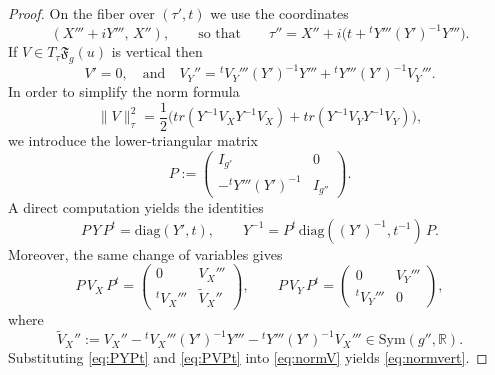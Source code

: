 \documentclass[11pt]{amsart}
\theoremstyle{plain}
\theoremstyle{definition}
\theoremstyle{remark}
\newcommand{\R}{\mathbb R}
\newcommand{\fF}{\mathfrak{F}}
\begin{document}
\begin{proof}
    On the fiber over $(\tau',t)$ we use the coordinates
    \[
        (X'''+iY''',\,X''),
        \qquad\text{so that}\qquad
        \tau''=X'' + i\bigl(t+{}^tY'''(Y')^{-1}Y'''\bigr).
    \]
    If $V\in T_{\tau}\fF_g(u)$ is vertical then
    \begin{equation}
        V'=0,\quad\text{and}\quad 
        V_Y'' ={}^tV_Y'''(Y')^{-1}Y'''+{}^tY'''(Y')^{-1}V_Y'''.
    \end{equation}
    In order to simplify the norm formula
    \begin{equation}
    \label{eq:normV}
        \|V\|_{\tau}^2=\frac{1}{2}\bigl(tr(Y^{-1}V_XY^{-1}V_X)+tr(Y^{-1}V_YY^{-1}V_Y)\bigr),
    \end{equation}
    we introduce the lower-triangular matrix
    \[
        P:=
        \begin{pmatrix}
            I_{g'} & 0\\
            -{}^tY'''(Y')^{-1} & I_{g''}
        \end{pmatrix}.
    \]
    A direct computation yields the identities
    \begin{equation}\label{eq:PYPt}
        P\,Y\,P^t=\mathrm{diag}(Y',t),
        \qquad
        Y^{-1}=P^t\,\mathrm{diag}((Y')^{-1},t^{-1})\,P.
    \end{equation}
    Moreover, the same change of variables gives
    \begin{equation}\label{eq:PVPt}
        P\,V_X\,P^t=
        \begin{pmatrix}
        0 & V_X'''\\
        {}^tV_X''' & \widetilde V_X''
        \end{pmatrix},
        \qquad
        P\,V_Y\,P^t=
        \begin{pmatrix}
        0 & V_Y'''\\
        {}^tV_Y''' & 0
        \end{pmatrix},
    \end{equation}
    where
    \begin{equation}\label{eq:v.tilde.pp}
        \widetilde V_X'':=
    V_X''-{}^tV_X'''(Y')^{-1}Y'''-{}^tY'''(Y')^{-1}V_X'''\in\mathrm{Sym}(g'',\R).
    \end{equation}
    Substituting \eqref{eq:PYPt} and \eqref{eq:PVPt} into \eqref{eq:normV} yields \eqref{eq:normvert}. 
\end{proof}
\end{document}
